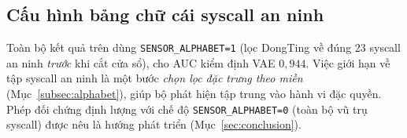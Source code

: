 \subsection{Cấu hình bảng chữ cái syscall an ninh}
Toàn bộ kết quả trên dùng \texttt{SENSOR\_ALPHABET=1} (lọc DongTing về đúng 23
syscall an ninh \emph{trước} khi cắt cửa sổ), cho AUC kiểm định VAE $0{,}944$. Việc
giới hạn về tập syscall an ninh là một bước \emph{chọn lọc đặc trưng theo miền}
(Mục~\ref{subsec:alphabet}), giúp bộ phát hiện tập trung vào hành vi đặc quyền. Phép
đối chứng định lượng với chế độ \texttt{SENSOR\_ALPHABET=0} (toàn bộ vũ trụ syscall)
được nêu là hướng phát triển (Mục~\ref{sec:conclusion}).
